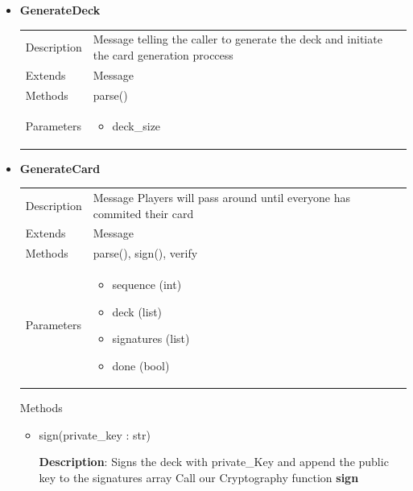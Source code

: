 \documentclass[11pt]{article}
\begin{document}
\begin{itemize}
\item
  \textbf{GenerateDeck} 

	
  \begin{longtable}[]{@{}ll@{}}
  \toprule
  \endhead
  Description & Message telling the caller to generate the deck and initiate the card generation proccess \tabularnewline
  Extends & Message\tabularnewline
  Methods & parse()\tabularnewline
  \begin{minipage}[t]{0.40\columnwidth}\raggedright
  Parameters\strut
  \end{minipage} & \begin{minipage}[t]{0.54\columnwidth}\raggedright
  \begin{itemize}
  	\item deck\_size
  \end{itemize}\strut
  \end{minipage}\tabularnewline
  \bottomrule
  \end{longtable}  
  
\item
  \textbf{GenerateCard}

  
  \begin{longtable}[]{@{}ll@{}}
  \toprule
  \endhead
  Description & Message Players will pass around until everyone has commited their card \tabularnewline
  Extends & Message\tabularnewline
  Methods & parse(), sign(), verify\tabularnewline
  \begin{minipage}[t]{0.40\columnwidth}\raggedright
  Parameters\strut
  \end{minipage} & \begin{minipage}[t]{0.54\columnwidth}\raggedright
  \begin{itemize}
  	\item sequence (int)
  	\item deck (list)
	\item signatures (list)
	\item done (bool)
  \end{itemize}\strut
  \end{minipage}\tabularnewline
  \bottomrule
  \end{longtable}  

  Methods 
  \begin{itemize}
  
	\item sign(private\_key : str)

  \textbf{Description}: Signs the deck with private\_Key and append the
  public key to the signatures array Call our Cryptography function
  \textbf{sign}


\end{itemize}
\end{itemize}
\end{document}
